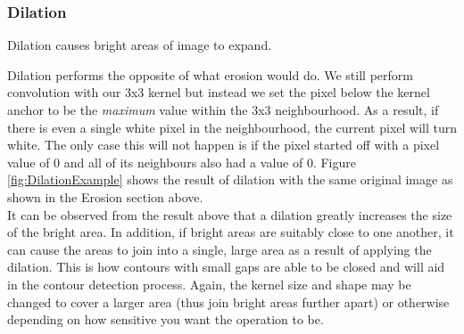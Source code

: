 \documentclass[11pt]{article}
\begin{document}
\subsubsection{Dilation}
\begin{center}
	Dilation causes bright areas of image to expand.
\end{center}

Dilation performs the opposite of what erosion would do. We still perform 
convolution with our 3x3 kernel but instead we set the pixel below the
kernel anchor to be the \textit{maximum} value within the 3x3 neighbourhood.
As a result, if there is even a single white pixel in the neighbourhood, the
current pixel will turn white. The only case this will not happen is if the 
pixel started off with a pixel value of 0 and all of its neighbours also had
a value of 0. Figure \ref{fig:DilationExample} shows the result of dilation with
the same original image as shown in the Erosion section above. 
\\
It can be observed from the result above that a dilation greatly increases
the size of the bright area. In addition, if bright areas are suitably close
to one another, it can cause the areas to join into a single, large
area as a result of applying the dilation.
This is how contours with small gaps are able to be closed and will aid in the
contour detection process. Again, the kernel size and shape may be changed to
cover a larger area (thus join bright areas further apart) or otherwise 
depending on how sensitive you want the operation to be.
\end{document}
